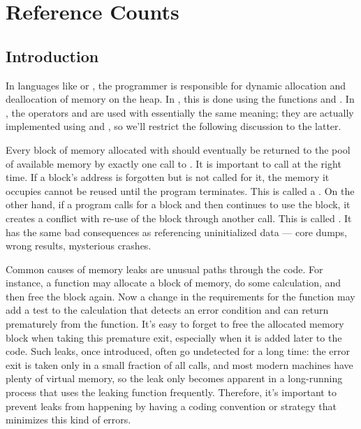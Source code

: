 \documentclass[twoside,openright]{report}
\begin{document}
\section{Reference Counts}

\subsection{Introduction}

In languages like \C{} or \Cpp{}, the programmer is responsible for
dynamic allocation and deallocation of memory on the heap.  In \C{}, this
is done using the functions  and .  In
\Cpp{}, the operators  and  are used with
essentially the same meaning; they are actually implemented using
 and , so we'll restrict the following
discussion to the latter.

Every block of memory allocated with  should eventually
be returned to the pool of available memory by exactly one call to
.  It is important to call  at the right
time.  If a block's address is forgotten but  is not
called for it, the memory it occupies cannot be reused until the
program terminates.  This is called a .  On the other
hand, if a program calls  for a block and then continues
to use the block, it creates a conflict with re-use of the block
through another  call.  This is called .  It has the same bad consequences as referencing uninitialized
data --- core dumps, wrong results, mysterious crashes.

Common causes of memory leaks are unusual paths through the code.  For
instance, a function may allocate a block of memory, do some
calculation, and then free the block again.  Now a change in the
requirements for the function may add a test to the calculation that
detects an error condition and can return prematurely from the
function.  It's easy to forget to free the allocated memory block when
taking this premature exit, especially when it is added later to the
code.  Such leaks, once introduced, often go undetected for a long
time: the error exit is taken only in a small fraction of all calls,
and most modern machines have plenty of virtual memory, so the leak
only becomes apparent in a long-running process that uses the leaking
function frequently.  Therefore, it's important to prevent leaks from
happening by having a coding convention or strategy that minimizes
this kind of errors.
\end{document}
